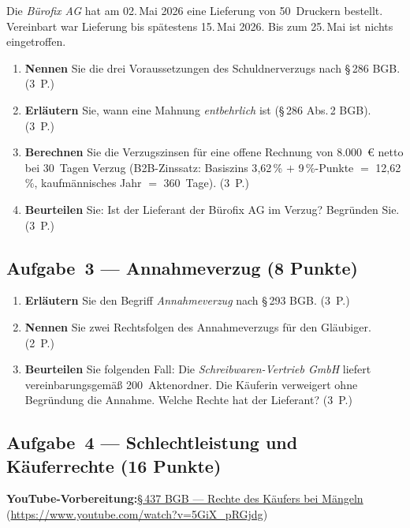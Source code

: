 \documentclass[11pt, a4paper]{article}
\begin{document}
\medskip
Die \emph{Bürofix AG} hat am 02.\,Mai 2026 eine Lieferung von 50~Druckern bestellt.
Vereinbart war Lieferung bis spätestens 15.\,Mai 2026. Bis zum 25.\,Mai ist nichts
eingetroffen.

\begin{enumerate}[label=(\alph*)]
  \item \textbf{Nennen} Sie die drei Voraussetzungen des Schuldnerverzugs nach §\,286 BGB. \hfill (3~P.)
  \item \textbf{Erläutern} Sie, wann eine Mahnung \emph{entbehrlich} ist (§\,286 Abs.\,2 BGB). \hfill (3~P.)
  \item \textbf{Berechnen} Sie die Verzugszinsen für eine offene Rechnung von 8.000~€ netto bei 30~Tagen Verzug (B2B-Zinssatz: Basiszins 3{,}62\,\% $+$ 9\,\%-Punkte $=$ 12{,}62\,\%, kaufmännisches Jahr $=$ 360~Tage). \hfill (3~P.)
  \item \textbf{Beurteilen} Sie: Ist der Lieferant der Bürofix AG im Verzug? Begründen Sie. \hfill (3~P.)
\end{enumerate}

\subsection*{Aufgabe~3 --- Annahmeverzug (8 Punkte)}

\begin{enumerate}[label=(\alph*)]
  \item \textbf{Erläutern} Sie den Begriff \emph{Annahmeverzug} nach §\,293 BGB. \hfill (3~P.)
  \item \textbf{Nennen} Sie zwei Rechtsfolgen des Annahmeverzugs für den Gläubiger. \hfill (2~P.)
  \item \textbf{Beurteilen} Sie folgenden Fall: Die \emph{Schreibwaren-Vertrieb GmbH} liefert vereinbarungsgemäß 200~Aktenordner. Die Käuferin verweigert ohne Begründung die Annahme. Welche Rechte hat der Lieferant? \hfill (3~P.)
\end{enumerate}

\subsection*{Aufgabe~4 --- Schlechtleistung und Käuferrechte (16 Punkte)}

\noindent\textbf{\color{bfwAccent}YouTube-Vorbereitung:}\enspace \href{https://www.youtube.com/watch?v=5GiX_pRGjdg}{§\,437 BGB --- Rechte des Käufers bei Mängeln} (\url{https://www.youtube.com/watch?v=5GiX_pRGjdg})
\end{document}
